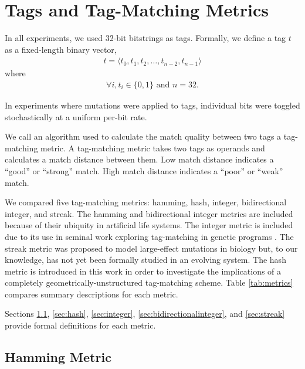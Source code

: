 \section{Tags and Tag-Matching Metrics}



In all experiments, we used 32-bit bitstrings as tags.
Formally, we define a tag $t$ as a fixed-length binary vector,
\begin{align*}
t = \langle t_0, t_1, t_2, \dots, t_{n-2}, t_{n-1} \rangle
\end{align*}
where
\begin{align*}
\forall i, t_i \in \{0, 1\} \text{ and } n=32.
\end{align*}

In experiments where mutations were applied to tags, individual bits were toggled stochastically at a uniform per-bit rate.

We call an algorithm used to calculate the match quality between two tags a tag-matching metric.
A tag-matching metric takes two tags as operands and calculates a match distance between them.
Low match distance indicates a ``good'' or ``strong'' match.
High match distance indicates a ``poor'' or ``weak'' match.

We compared five tag-matching metrics: hamming, hash, integer, bidirectional integer, and streak.
The hamming and bidirectional integer metrics are included because of their ubiquity in artificial life systems.
The integer metric is included due to its use in seminal work exploring tag-matching in genetic programs \citep{spector2011tag, spector2011s,spector2012tag}.
The streak metric was proposed to model large-effect mutations in biology but, to our knowledge, has not yet been formally studied in an evolving system.
The hash metric is introduced in this work in order to investigate the implications of a completely geometrically-unstructured tag-matching scheme.
Table \ref{tab:metrics} compares summary descriptions for each metric.




Sections \ref{sec:hamming}, \ref{sec:hash}, \ref{sec:integer}, \ref{sec:bidirectionalinteger}, and \ref{sec:streak} provide formal definitions for each metric.

\subsection{Hamming Metric} \label{sec:hamming}

